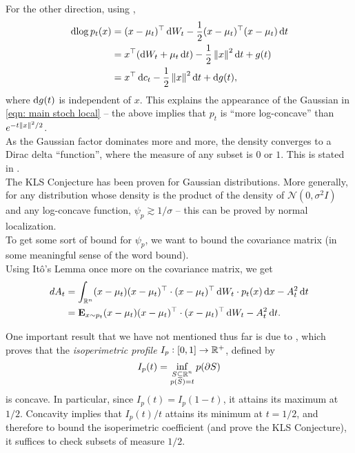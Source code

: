 \documentclass{article}
\begin{document}
		For the other direction, using ,
		\begin{align*}
			\d{\log p_t(x)} &= (x-\mu_t)^\top \d{W}_t - \frac{1}{2} (x-\mu_t)^\top (x-\mu_t) \d{t} \\
				&= x^\top (\d{W}_t + \mu_t\d{t}) - \frac{1}{2}\norm{x}^2\d{t} + g(t) \\
				&= x^\top\d{c}_t - \frac{1}{2}\norm{x}^2\d{t} + \d{g}(t),
		\end{align*}
		where $\operatorname{d}\!{g}(t)$ is independent of $x$. This explains the appearance of the Gaussian in \eqref{eqn: main stoch local} -- the above implies that $p_t$ is ``more log-concave'' than $e^{-t\left\lVert x\right\rVert^2/2}$.\\
		As the Gaussian factor dominates more and more, the density converges to a Dirac delta ``function'', where the measure of any subset is $0$ or $1$. This is stated in .\\

		The KLS Conjecture has been proven for Gaussian distributions. More generally, for any distribution whose density is the product of the density of $\mathcal{N}(0,\sigma^2 I)$ and any log-concave function, $\psi_p \gtrsim 1/\sigma$ -- this can be proved by normal localization.\\
		
		To get some sort of bound for $\psi_p$, we want to bound the covariance matrix (in some meaningful sense of the word bound).\\
		Using It\^{o}'s Lemma once more on the covariance matrix, we get 
		\begin{align}
			d{A}_t &= \int_{\mathbb{R}^n} (x-\mu_t)(x-\mu_t)^\top \cdot (x-\mu_t)^\top\operatorname{d}\!{W}_t \cdot p_t(x) \operatorname{d}\!{x} - A_t^2 \operatorname{d}\!{t} \nonumber \\
				&= \textbf{E}_{x \sim p_t} (x-\mu_t)(x-\mu_t)^\top \cdot (x-\mu_t)^\top\operatorname{d}\!{W}_t - A_t^2 \operatorname{d}\!{t}. \label{eqn: dAt expression}
		\end{align}

		One important result that we have not mentioned thus far is due to \cite{milman2008isoperimetricprofile}, which proves that the \textit{isoperimetric profile} $I_p : [0,1]\to\mathbb{R}^+$, defined by
		\[ I_p(t) = \inf_{\substack{S\subseteq\mathbb{R}^n \\ p(S) = t}} p(\partial S) \]
		is concave. In particular, since $I_p(t) = I_p(1-t)$, it attains its maximum at $1/2$. Concavity implies that $I_p(t)/t$ attains its minimum at $t = 1/2$, and therefore to bound the isoperimetric coefficient (and prove the KLS Conjecture), it suffices to check subsets of measure $1/2$.\\
\end{document}

